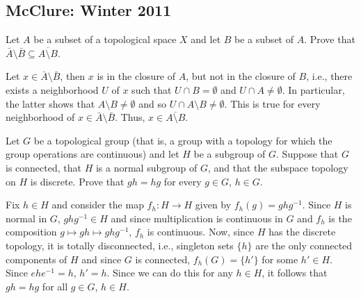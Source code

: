 \subsection{McClure: Winter 2011}
\setcounter{exercise}{0}

\begin{problem}
  Let \(A\) be a subset of a topological space \(X\) and let \(B\) be a
  subset of \(A\). Prove that
  \(\bar A\setminus\bar B\subseteq\overline{A\setminus B}\).
\end{problem}
\begin{solution}
  Let \(x\in\bar A\setminus\bar B\), then \(x\) is in the closure of \(A\),
  but not in the closure of \(B\), i.e., there exists a neighborhood \(U\)
  of \(x\) such that \(U\cap B=\emptyset\) and \(U\cap A\neq\emptyset\). In
  particular, the latter shows that \(A\setminus B\neq\emptyset\) and so
  \(U\cap A\setminus B\neq\emptyset\). This is true for every neighborhood
  of \(x\in\bar A\setminus\bar B\). Thus, \(x\in\overline{A\setminus B}\).
\end{solution}

\begin{problem}
  Let \(G\) be a topological group (that is, a group with a topology for
  which the group operations are continuous) and let \(H\) be a subgroup of
  \(G\). Suppose that \(G\) is connected, that \(H\) is a normal subgroup
  of \(G\), and that the subspace topology on \(H\) is discrete. Prove that
  \(gh=hg\) for every \(g\in G\), \(h\in G\).
\end{problem}
\begin{solution}
  Fix \(h\in H\) and consider the map \(f_h \colon H\to H\) given by
  \(f_h(g)=ghg^{-1}\). Since \(H\) is normal in \(G\), \(ghg^{-1}\in H\)
  and since multiplication is continuous in \(G\) and \(f_h\) is the
  composition \(g\mapsto gh\mapsto ghg^{-1}\), \(f_h\) is continuous. Now,
  since \(H\) has the discrete topology, it is totally disconnected, i.e.,
  singleton sets \(\{h\}\) are the only connected components of \(H\) and
  since \(G\) is connected, \(f_h(G)=\{h'\}\) for some \(h'\in H\). Since
  \(ehe^{-1}=h\), \(h'=h\). Since we can do this for any \(h\in H\),  it
  follows that \(gh=hg\) for all \(g\in G\), \(h\in H\).
\end{solution}

